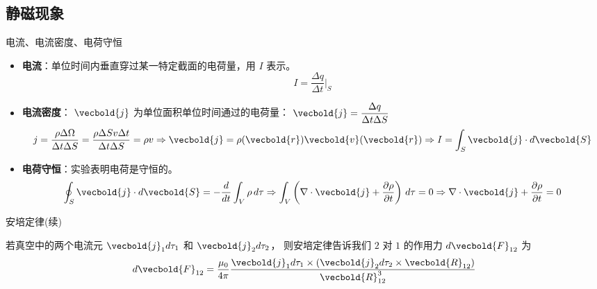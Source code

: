 \subsection{静磁现象}
\begin{defn}
    电流、电流密度、电荷守恒
\begin{itemize}
    \item \textbf{电流}：单位时间内垂直穿过某一特定截面的电荷量，用 \( I \) 表示。
    \[I = \frac{\Delta q}{\Delta t} \bigg|_S\]
    \item \textbf{电流密度}： \( \vecbold{j} \) 为单位面积单位时间通过的电荷量：
    \(\displaystyle \vecbold{j} = \frac{\Delta q}{\Delta t \Delta S}\)
\[
j = \frac{\rho \Delta \Omega}{\Delta t \Delta S} 
= \frac{\rho \Delta S v \Delta t}{\Delta t \Delta S} = \rho v
\Rightarrow \vecbold{j} = \rho(\vecbold{r}) \vecbold{v}(\vecbold{r}) 
\Rightarrow I = \int_S \vecbold{j} \cdot d\vecbold{S}
\]
\item \textbf{电荷守恒}：实验表明电荷是守恒的。
\[
\oint_{S} \vecbold{j} \cdot d\vecbold{S} 
= -\frac{d}{dt} \int_{V} \rho \, d\tau
\Rightarrow \int_V\left(\nabla\cdot \vecbold{j}
+\frac{\pa \rho}{\pa t}\right)\,d\tau =0
\Rightarrow \nabla\cdot \vecbold{j}+\frac{\pa \rho}{\pa t}=0
\]
\end{itemize}
\end{defn}
\begin{law}
    安培定律(续)
    
    若真空中的两个电流元 \(\vecbold{j}_1 d \tau_1\) 和 \(\vecbold{j}_2 d \tau_2\)，
    则安培定律告诉我们 \(2\) 对 \(1\) 的作用力 \(d \vecbold{F}_{12}\) 为
\[
d \vecbold{F}_{12} = \frac{\mu_0}{4 \pi} \frac{\vecbold{j}_1 d \tau_1 \times (\vecbold{j}_2 d \tau_2 \times \vecbold{R}_{12})}{\vecbold{R}_{12}^3}
\]
\end{law}
